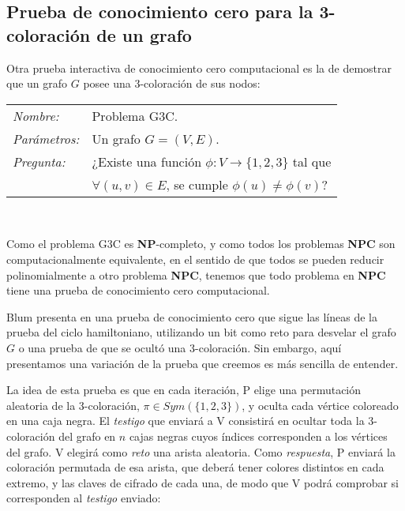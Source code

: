 \subsection{Prueba de conocimiento cero para la 3-coloración de un grafo}

Otra prueba interactiva de conocimiento cero computacional es la de demostrar que un grafo $G$ posee una 3-coloración de sus nodos:

\hfil

\begin{tabular}{|ll}
	\textit{Nombre:} & Problema G3C. \\
	\textit{Parámetros:} & Un grafo $G=(V,E)$. \\
	\textit{Pregunta:} & ¿Existe una función $\phi : V \to \{1,2,3\}$ tal que \\ & $\forall (u,v)\in E$, se cumple $\phi(u)\neq \phi(v)$? \\
\end{tabular}
\\

\hfil

Como el problema G3C es \textbf{NP}-completo, y como todos los problemas \textbf{NPC} son computacionalmente equivalente, en el sentido de que todos se pueden reducir polinomialmente a otro problema \textbf{NPC}, tenemos que todo problema en \textbf{NPC} tiene una prueba de conocimiento cero computacional.


\hfil

Blum presenta en \citep{blum} una prueba de conocimiento cero que sigue las líneas de la prueba del ciclo hamiltoniano, utilizando un bit como reto para desvelar el grafo $G$ o una prueba de que se ocultó una 3-coloración. Sin embargo, aquí presentamos una variación de la prueba que creemos es más sencilla de entender. 

La idea de esta prueba es que en cada iteración, P elige una permutación aleatoria de la 3-coloración, $\pi \in Sym(\{1,2,3\})$, y oculta cada vértice coloreado en una caja negra. El \textit{testigo} que enviará a V consistirá en ocultar toda la 3-coloración del grafo en $n$ cajas negras cuyos índices corresponden a los vértices del grafo. V elegirá como \textit{reto} una arista aleatoria. Como \textit{respuesta}, P enviará la coloración permutada de esa arista, que deberá tener colores distintos en cada extremo, y las claves de cifrado de cada una, de modo que V podrá comprobar si corresponden al \textit{testigo} enviado:

\hfil

